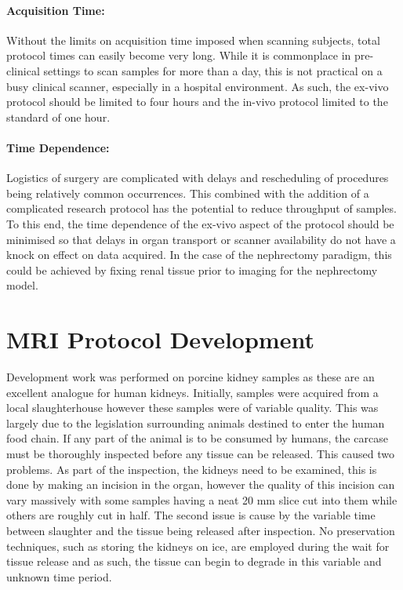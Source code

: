\paragraph{Acquisition Time:} Without the limits on acquisition time imposed when scanning subjects, total protocol times can easily become very long. While it is commonplace in pre-clinical settings to scan samples for more than a day, this is not practical on a busy clinical scanner, especially in a hospital environment. As such, the ex-vivo protocol should be limited to four hours and the in-vivo protocol limited to the standard of one hour.

\paragraph{Time Dependence:} Logistics of surgery are complicated with delays and rescheduling of procedures being relatively common occurrences. This combined with the addition of a complicated research protocol has the potential to reduce throughput of samples. To this end, the time dependence of the ex-vivo aspect of the protocol should be minimised so that delays in organ transport or scanner availability do not have a knock on effect on data acquired. In the case of the nephrectomy paradigm, this could be achieved by fixing renal tissue prior to imaging for the nephrectomy model.


\section{MRI Protocol Development}
Development work was performed on porcine kidney samples as these are an excellent analogue for human kidneys. Initially, samples were acquired from a local slaughterhouse however these samples were of variable quality. This was largely due to the legislation surrounding animals destined to enter the human food chain. If any part of the animal is to be consumed by humans, the carcase must be thoroughly inspected before any tissue can be released. This caused two problems. As part of the inspection, the kidneys need to be examined, this is done by making an incision in the organ, however the quality of this incision can vary massively with some samples having a neat 20 mm slice cut into them while others are roughly cut in half. The second issue is cause by the variable time between slaughter and the tissue being released after inspection. No preservation techniques, such as storing the kidneys on ice, are employed during the wait for tissue release and as such, the tissue can begin to degrade in this variable and unknown time period.

